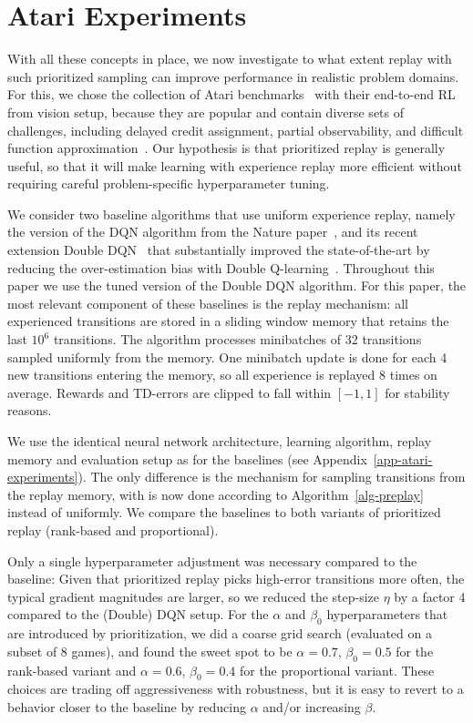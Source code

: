 \documentclass[a4paper]{article}
\begin{document}
\section{Atari Experiments} 

With all these concepts in place, 
we now investigate to what extent replay with such prioritized sampling 
can improve performance in realistic problem domains. 
For this, we chose the collection of Atari benchmarks~\citep{bellemare2012arcade} with their end-to-end RL from vision setup,
because they are popular and contain diverse sets of challenges, including delayed credit assignment, partial observability, and difficult function approximation~\citep{dqn-nature,double-dqn}.
Our hypothesis is that prioritized replay is generally useful, so that it will make learning with experience replay more efficient
without requiring careful problem-specific hyperparameter tuning.

We consider two baseline algorithms that use uniform experience replay, namely the version of the DQN algorithm from the Nature paper~\citep{dqn-nature},
and its recent extension Double DQN~\citep{double-dqn} that substantially improved the state-of-the-art by reducing the over-estimation bias with Double Q-learning~\citep{double-q}.  Throughout this paper we use the tuned version of the Double DQN algorithm.
For this paper, the most relevant component of these baselines is the replay mechanism:
all experienced transitions are stored in a sliding window memory that retains the
last $10^6$ transitions.
The algorithm processes minibatches of 32 transitions sampled uniformly from the memory. One minibatch update is done for each 4 new transitions entering the memory, so all experience is replayed 8 times on average. Rewards and TD-errors are clipped to fall within $[-1, 1]$ for stability reasons.

We use the identical neural network architecture, learning algorithm, replay memory and evaluation setup as for the baselines (see Appendix~\ref{app-atari-experiments}).
The only difference is the mechanism for sampling transitions from the replay memory, with is now done according to Algorithm~\ref{alg-preplay} instead of uniformly.
We compare the baselines to both variants of prioritized replay (rank-based and proportional).

Only a single hyperparameter adjustment was necessary compared to the baseline:
Given that prioritized replay picks high-error transitions more often, the typical gradient magnitudes
are larger, so we reduced the step-size $\eta$ by a factor 4 compared to the (Double) DQN setup.
For the $\alpha$ and $\beta_0$ hyperparameters that are introduced by prioritization, 
we did a coarse grid search (evaluated on a subset of 8 games), 
and found the sweet spot to be $\alpha = 0.7$, $\beta_0 = 0.5$ for the rank-based variant
and $\alpha = 0.6$, $\beta_0 = 0.4$ for the proportional variant.
These choices are trading off aggressiveness with robustness, but it is easy to revert to a behavior closer to the baseline by reducing $\alpha$ and/or increasing $\beta$.
\end{document}
